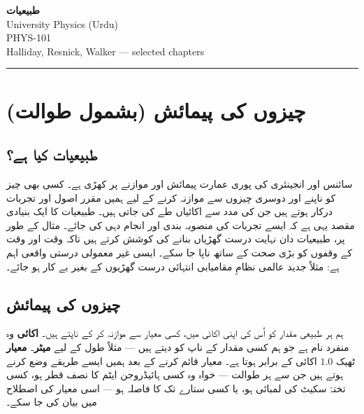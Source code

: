 \documentclass{urdu-textbook}
\begin{document}
\begin{center}
{\color{seccolor}\Huge\bfseries طبیعیات}\\[10pt]
{\latinfont\Large University Physics (Urdu)}\\[8pt]
{\latinfont\large PHYS-101}\\[6pt]
{\latinfont\small Halliday, Resnick, Walker — selected chapters}
\end{center}
{\color{rulecolor}\rule{\linewidth}{1.2pt}}
\vspace{1.5em}
\clearpage
{}
\hypertarget{ux686ux6ccux632ux648ux6ba-ux6a9ux6cc-ux67eux6ccux645ux627ux626ux634-ux628ux634ux645ux648ux644-ux637ux648ux627ux644ux62a}{%
\section{چیزوں کی پیمائش (بشمول
طوالت)}\label{ux686ux6ccux632ux648ux6ba-ux6a9ux6cc-ux67eux6ccux645ux627ux626ux634-ux628ux634ux645ux648ux644-ux637ux648ux627ux644ux62a}}

\hypertarget{ux637ux628ux6ccux639ux6ccux627ux62a-ux6a9ux6ccux627-ux6c1ux6d2}{%
\subsection{طبیعیات کیا
ہے؟}\label{ux637ux628ux6ccux639ux6ccux627ux62a-ux6a9ux6ccux627-ux6c1ux6d2}}

سائنس اور انجینئری کی پوری عمارت پیمائش اور موازنے پر کھڑی ہے۔ کسی بھی
چیز کو ناپنے اور دوسری چیزوں سے موازنہ کرنے کے لیے ہمیں مقرر اصول اور
تجربات درکار ہوتے ہیں جن کی مدد سے اکائیاں طے کی جاتی ہیں۔ طبیعیات کا
ایک بنیادی مقصد یہی ہے کہ ایسے تجربات کی منصوبہ بندی اور انجام دہی کی
جائے۔ مثال کے طور پر، طبیعیات دان نہایت درست گھڑیاں بنانے کی کوشش کرتے
ہیں تاکہ وقت اور وقت کے وقفوں کو بڑی صحت کے ساتھ ناپا جا سکے۔ ایسی غیر
معمولی درستی واقعی اہم ہے: مثلاً جدید عالمی نظامِ مقامیابی  انتہائی
درست گھڑیوں کے بغیر بے کار ہو جائے۔

\hypertarget{ux686ux6ccux632ux648ux6ba-ux6a9ux6cc-ux67eux6ccux645ux627ux626ux634}{%
\subsection{چیزوں کی
پیمائش}\label{ux686ux6ccux632ux648ux6ba-ux6a9ux6cc-ux67eux6ccux645ux627ux626ux634}}

ہم ہر طبیعی مقدار کو اُس کی اپنی اکائی میں، کسی معیار سے موازنہ کر کے
ناپتے ہیں۔ \textbf{اکائی} وہ منفرد نام ہے جو ہم کسی مقدار کے ناپ کو دیتے
ہیں --- مثلاً طول کے لیے \textbf{میٹر}۔ \textbf{معیار} ٹھیک \(1.0\) اکائی
کے برابر ہوتا ہے۔ معیار قائم کرنے کے بعد ہمیں ایسے طریقے وضع کرنے ہوتے
ہیں جن سے ہر طوالت --- خواہ وہ کسی ہائیڈروجن ایٹم کا نصف قطر ہو، کسی
تختۂ سکیٹ کی لمبائی ہو، یا کسی ستارے تک کا فاصلہ ہو --- اسی معیار کی
اصطلاح میں بیان کی جا سکے۔
\end{document}
